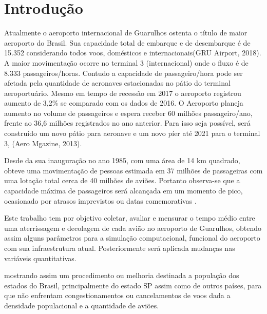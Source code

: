 \documentclass[12pt]{article}
\begin{document}
  
  \section{Introdução}
  
    Atualmente o aeroporto internacional de Guarulhos ostenta o título de maior
    aeroporto do Brasil. Sua capacidade total de embarque e de desembarque é
    de 15.352 considerando todos voos, domésticos e internacionais(GRU Airport, 2018).
    A maior movimentação ocorre no terminal 3 (internacional) onde o fluxo é de
    8.333 passageiros/horas. Contudo a capacidade de passageiro/hora pode ser 
    afetada pela quantidade de aeronaves estacionadas no pátio do terminal
    aeroportuário. Mesmo em tempo de recessão em 2017 o aeroporto registrou 
    aumento de 3,2\% se comparado com os dados de 2016. O Aeroporto planeja
    aumento no volume de passageiros e espera receber 60 milhões passageiro/ano,
    frente ao 36,6 milhões registrados no ano anterior. Para isso seja possível,
    será construído um novo pátio para aeronave e um novo píer até 2021 para o 
    terminal 3, (Aero Mgazine, 2013).
  
    Desde da sua inauguração no ano 1985, com uma área de 14 km quadrado,
    obteve uma movimentação de pessoas estimada em  37 milhões de passageiras
    com uma lotação total cerca de 40 milhões de aviões. Portanto observa-se
    que a capacidade máxima de passageiros será alcançada em um momento de
    pico, ocasionado por atrasos imprevistos ou datas comemorativas
    \cite{Moser:07}.
    
  
  
  
  Este trabalho tem por objetivo coletar, avaliar e mensurar o tempo médio
  entre uma aterrissagem e  decolagem de cada avião no aeroporto de Guarulhos,
  obtendo assim alguns parâmetros para a simulação computacional, funcional 
  do aeroporto com sua infraestrutura atual.
  Posteriormente será aplicada mudanças nas variáveis quantitativas.
  
  mostrando assim um procedimento ou melhoria destinada  a população dos
  estados do Brasil, principalmente do estado SP assim como de outros países,
  para que não enfrentam congestionamentos ou cancelamentos de voos dada a 
  densidade populacional e a quantidade de aviões.
  
\end{document}
